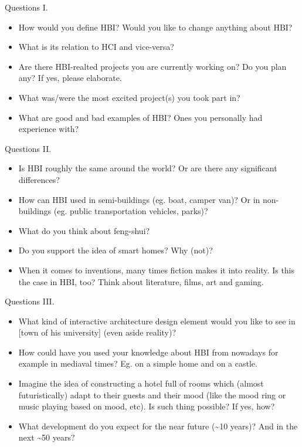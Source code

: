 \documentclass[10pt]{beamer}
\begin{document}
\begin{frame}{Questions I.}
	\begin{itemize}
        \pause{}
		\item How would you define HBI\@? Would you like to change anything about HBI\@?
		\pause{}
		\item What is its relation to HCI and vice-versa?
		\pause{}
		\item Are there HBI-realted projects you are currently working on? Do you plan any? If yes, please elaborate. 
		\pause{}
		\item What was/were the most excited project(s) you took part in?
		\pause{}
		\item What are good and bad examples of HBI\@? Ones you personally had experience with?
	\end{itemize}	
\end{frame}


\begin{frame}{Questions II.}
	\begin{itemize}
        \pause{}
		\item Is HBI roughly the same around the world? Or are there any significant differences?
		\pause{}
		\item How can HBI used in semi-buildings (eg. boat, camper van)? Or in non-buildings (eg. public transportation vehicles, parks)?
		\pause{}
		\item What do you think about feng-shui?
		\pause{}
		\item Do you support the idea of smart homes? Why (not)?
		\pause{}
    \item When it comes to inventions, many times fiction makes it into reality. Is this the case in HBI, too? Think about literature, films, art and gaming.
	\end{itemize}	
\end{frame}


\begin{frame}{Questions III.}
	\begin{itemize}
        \pause{}
		\item What kind of interactive architecture design element would you like to see in [town of his university] (even aside reality)?
		\pause{}
    \item How could have you used your knowledge about HBI from nowadays for example in mediaval times? Eg. on a simple home and on a castle.
		\pause{}
		\item Imagine the idea of constructing a hotel full of rooms which (almost futuristically) adapt to their guests and their mood (like the mood ring or music playing based on mood, etc). Is such thing possible? If yes, how?
		\pause{}
		\item What development do you expect for the near future (\~{}10 years)? And in the next \~{}50 years?
	\end{itemize}	
\end{frame}

  

\end{document}
